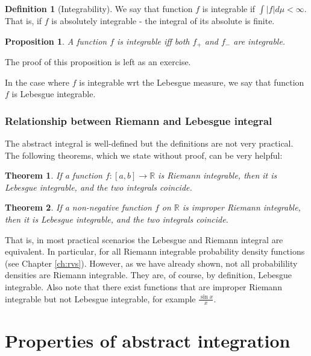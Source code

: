 \documentclass{book}
\theoremstyle{plain}%
\newtheorem{theorem}{Theorem}[section]
\newtheorem{proposition}{Proposition}[section]
\theoremstyle{definition}
\newtheorem{definition}{Definition}[section]
\newlength{\arrow}
\begin{document}
\begin{definition}[Integrability]
We say that function $f$ is integrable if $\int |f| d\mu <  \infty$. That is, if $f$ is absolutely integrable - the integral of its absolute is finite.
\end{definition}

\begin{proposition} A function $f$ is integrable iff both $f_+$ and $f_-$ are integrable.\label{prop:integrable}
\end{proposition}

The proof of this proposition is left as an exercise.

In the case where $f$ is integrable wrt the Lebesgue measure, we say that function $f$ is Lebesgue integrable.

\subsubsection*{Relationship between Riemann and Lebesgue integral}

The abstract integral is well-defined but the definitions are not very practical. The following theorems, which we state without proof, can be very helpful:

\begin{theorem}
If a function $f : [a, b] \rightarrow \mathbb{R}$ is Riemann integrable, then it is Lebesgue integrable, and the two integrals coincide.
\end{theorem}

\begin{theorem}
If a non-negative function $f$ on $\mathbb{R}$ is improper Riemann integrable, then it is Lebesgue integrable, and the two integrals coincide.
\end{theorem}

That is, in most practical scenarios the Lebesgue and Riemann integral are equivalent. In particular, for all Riemann integrable probability density functions (see Chapter \ref{ch:rvs}). However, as we have already shown, not all probabilility densities are Riemann integrable. They are, of course, by definition, Lebesgue integrable. Also note that there exist functions that are improper Riemann integrable but not Lebesgue integrable, for example $\frac{\sin x}{x}$.

\section{Properties of abstract integration}
\end{document}
